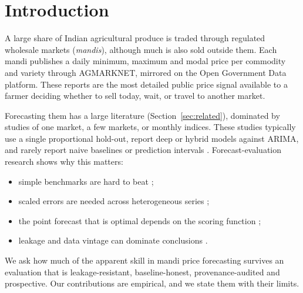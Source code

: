 \section{Introduction}\label{sec:intro}

A large share of Indian agricultural produce is traded through regulated wholesale markets (\emph{mandis}), although much is also sold outside them.
Each mandi publishes a daily minimum, maximum and modal price per commodity and variety through AGMARKNET, mirrored on the Open Government Data platform.
These reports are the most detailed public price signal available to a farmer deciding whether to sell today, wait, or travel to another market.

Forecasting them has a large literature (Section~\ref{sec:related}), dominated by studies of one market, a few markets, or monthly indices.
These studies typically use a single proportional hold-out, report deep or hybrid models against ARIMA, and rarely report naive baselines or prediction intervals \cite{paul2022brinjal,manogna2025deep,kumar2021onion}.
Forecast-evaluation research shows why this matters:
\begin{itemize}
  \item simple benchmarks are hard to beat \cite{makridakis2018statistical,makridakis2020m4};
  \item scaled errors are needed across heterogeneous series \cite{hyndman2006another};
  \item the point forecast that is optimal depends on the scoring function \cite{gneiting2011making,kolassa2016evaluating};
  \item leakage and data vintage can dominate conclusions \cite{hewamalage2022pitfalls,bokun2023fredsd}.
\end{itemize}

We ask how much of the apparent skill in mandi price forecasting survives an evaluation that is leakage-resistant, baseline-honest, provenance-audited and prospective.
Our contributions are empirical, and we state them with their limits.

